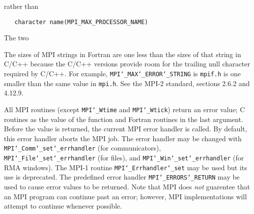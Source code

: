 rather than
\begin{verbatim}
   character name(MPI_MAX_PROCESSOR_NAME)
\end{verbatim}

The two
\par
\par
The sizes of MPI strings in Fortran are one less than the sizes of that
string in C/C++ because the C/C++ versions provide room for the trailing
null character required by C/C++.  For example, {\tt MPI{\tt \char`\_}MAX{\tt \char`\_}ERROR{\tt \char`\_}STRING} is
{\tt mpif.h} is one smaller than the same value in {\tt mpi.h}.  See the MPI-2
standard, sections 2.6.2 and 4.12.9.
\par
\par
{}
\par
All MPI routines (except {\tt MPI{\tt \char`\_}Wtime} and {\tt MPI{\tt \char`\_}Wtick}) return an error value;
C routines as the value of the function and Fortran routines in the last
argument.  Before the value is returned, the current MPI error handler is
called.  By default, this error handler aborts the MPI job.  The error handler
may be changed with {\tt MPI{\tt \char`\_}Comm{\tt \char`\_}set{\tt \char`\_}errhandler} (for communicators),
{\tt MPI{\tt \char`\_}File{\tt \char`\_}set{\tt \char`\_}errhandler} (for files), and {\tt MPI{\tt \char`\_}Win{\tt \char`\_}set{\tt \char`\_}errhandler} (for
RMA windows).  The MPI-1 routine {\tt MPI{\tt \char`\_}Errhandler{\tt \char`\_}set} may be used but
its use is deprecated.  The predefined error handler
{\tt MPI{\tt \char`\_}ERRORS{\tt \char`\_}RETURN} may be used to cause error values to be returned.
Note that MPI does {\em not} guarentee that an MPI program can continue past
an error; however, MPI implementations will attempt to continue whenever
possible.
\par
{}
\endmanpage
